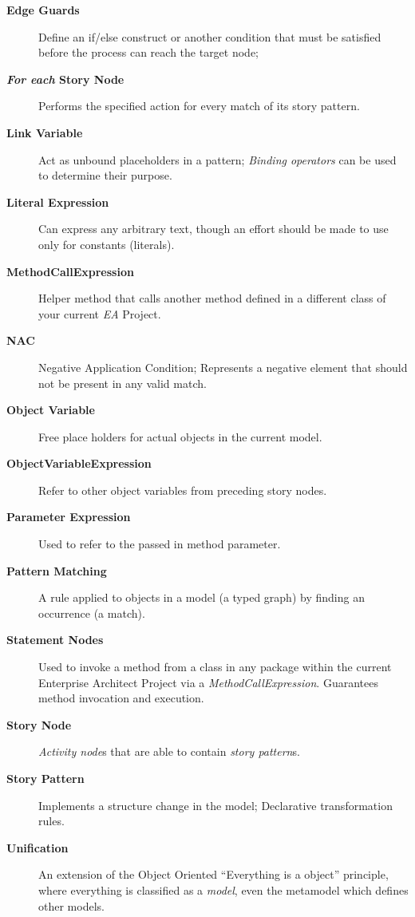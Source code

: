 \begin{description}
\item[\bf Edge Guards]
Define an if/else construct or another condition that must be satisfied before the process can reach the target node;

\item[\bf \emph{For each} Story Node]
Performs the specified action for every match of its story pattern.

\item[\bf Link Variable]
Act as unbound placeholders in a pattern; \emph{Binding operators} can be used to determine their purpose.

\item[\bf Literal Expression]
Can express any arbitrary text, though an effort should be made to use only for constants (literals).

\item[\bf MethodCallExpression]
Helper method that calls another method defined in a different class of your current \emph{EA} Project.

\item[\bf NAC]
Negative Application Condition; Represents a negative element that should not be present in any valid match.

\item[\bf Object Variable]
Free place holders for actual objects in the current model.

\item[\bf ObjectVariableExpression]
Refer to other object variables from preceding story nodes.

\item[\bf Parameter Expression]
Used to refer to the passed in method parameter.

\item[\bf Pattern Matching]
A rule applied to objects in a model (a typed graph) by finding an occurrence (a match). 

\item[\bf Statement Nodes]
Used to invoke a method from a class in any package within the current Enterprise Architect Project via a \emph{MethodCallExpression}. Guarantees method
invocation and execution.

\item[\bf Story Node]
\emph{Activity node}s that are able to contain \emph{story pattern}s.

\item[\bf Story Pattern]
Implements a structure change in the model; Declarative transformation rules.

\item[\bf Unification]
An extension of the Object Oriented ``Everything is a object'' principle, where everything is classified as a \emph{model}, even the metamodel which defines
other models.
\end{description}